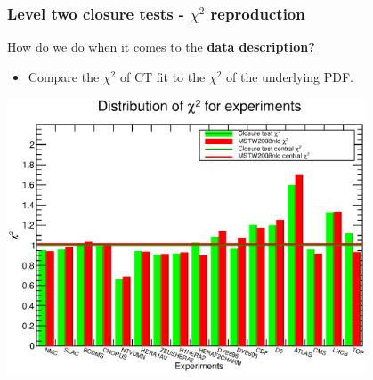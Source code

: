 \documentclass[10pt]{beamer}
\begin{document}
\begin{frame}
\frametitle{Level two closure tests - $\chi^2$ reproduction}
\underline{How do we do when it comes to the \textbf{data description?} }\\

\begin{itemize}
\item Compare the $\chi^2$ of CT fit to the $\chi^2$ of the underlying PDF.
\end{itemize}

\begin{center}
\includegraphics[width=0.8\textwidth]{figures/Chi2Histo_CT_vs_MSTW.eps}
\end{center}

\end{frame}
\end{document}
